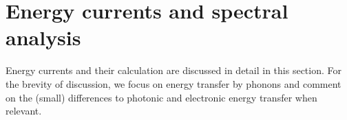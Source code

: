 \section{Energy currents and spectral analysis}
\label{sec:th_currents}
Energy currents and their calculation are discussed in detail in this section. For the brevity of discussion, we focus on energy transfer by phonons and comment on the (small) differences to photonic and electronic energy transfer when relevant. 






